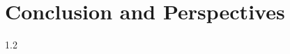 \chapter{Conclusion and Perspectives}
\pagestyle{fancy}
\fancyhf{}
\fancyhead[R]{\bfseries\rightmark}
\fancyfoot[R]{\thepage}
\renewcommand{\headrulewidth}{0.5pt}
\renewcommand{\footrulewidth}{0pt}
\renewcommand{\chaptermark}[1]{\markboth{\MakeUppercase{\chaptername~\thechapter.\ #1}}{}}
\renewcommand{\sectionmark}[1]{\markright{\thesection~ #1}}

\begin{spacing}{1.2}

%
%


\end{spacing}
